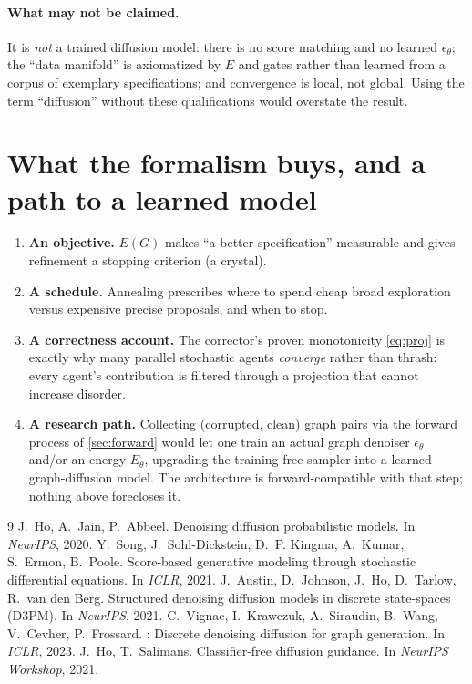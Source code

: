 \documentclass[11pt,letterpaper]{article}
\theoremstyle{plain}
\theoremstyle{definition}
\begin{document}
\paragraph{What may not be claimed.} It is \emph{not} a trained diffusion model:
there is no score matching and no learned $\epsilon_\theta$; the ``data manifold''
is axiomatized by $E$ and gates rather than learned from a corpus of exemplary
specifications; and convergence is local, not global. Using the term ``diffusion''
without these qualifications would overstate the result.

\section{What the formalism buys, and a path to a learned model}
\label{sec:buys}

\begin{enumerate}[leftmargin=1.4em,itemsep=2pt]
  \item \textbf{An objective.} $E(G)$ makes ``a better specification'' measurable
  and gives refinement a stopping criterion (a crystal).
  \item \textbf{A schedule.} Annealing prescribes where to spend cheap broad
  exploration versus expensive precise proposals, and when to stop.
  \item \textbf{A correctness account.} The corrector's proven monotonicity
  \eqref{eq:proj} is exactly why many parallel stochastic agents \emph{converge}
  rather than thrash: every agent's contribution is filtered through a projection
  that cannot increase disorder.
  \item \textbf{A research path.} Collecting (corrupted, clean) graph pairs via the
  forward process of \cref{sec:forward} would let one train an actual graph
  denoiser $\epsilon_\theta$ and/or an energy $E_\theta$, upgrading the
  training-free sampler into a learned graph-diffusion model. The architecture is
  forward-compatible with that step; nothing above forecloses it.
\end{enumerate}

\begin{thebibliography}{9}
 J.~Ho, A.~Jain, P.~Abbeel.
  \newblock Denoising diffusion probabilistic models.
  \newblock In {\em NeurIPS}, 2020.
 Y.~Song, J.~Sohl-Dickstein, D.~P. Kingma, A.~Kumar,
  S.~Ermon, B.~Poole.
  \newblock Score-based generative modeling through stochastic differential
  equations.
  \newblock In {\em ICLR}, 2021.
 J.~Austin, D.~Johnson, J.~Ho, D.~Tarlow,
  R.~van den Berg.
  \newblock Structured denoising diffusion models in discrete state-spaces (D3PM).
  \newblock In {\em NeurIPS}, 2021.
 C.~Vignac, I.~Krawczuk, A.~Siraudin, B.~Wang,
  V.~Cevher, P.~Frossard.
  : Discrete denoising diffusion for graph generation.
  \newblock In {\em ICLR}, 2023.
 J.~Ho, T.~Salimans.
  \newblock Classifier-free diffusion guidance.
  \newblock In {\em NeurIPS Workshop}, 2021.
\end{thebibliography}
\end{document}
